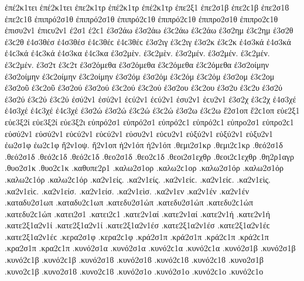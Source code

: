 {ἐπέ2κ1τει ἐπέ2κ1τει
ἐπε2κ1τρ   %
ἐπέ2κ1τρ ἐπέ2κ1τρ
ἐπε2ξ1
ἐπε2σ1β ἐπε2ϲ1β ἐπε2σ1ϐ ἐπε2ϲ1ϐ %
ἐπιπρό2σ1θ ἐπιπρό2σ1θ ἐπιπρό2ϲ1θ ἐπιπρό2ϲ1θ   %
ἐπιπρο2σ1θ ἐπιπρο2ϲ1θ
ἐπισυ2ν1 ἐπιϲυ2ν1   %
ἐ2σ1 ἐ2ϲ1
ἐ3σ2άω ἐ3σ2άω ἐ3ϲ2άω ἐ3ϲ2άω   %
ἐ3σ2ημ ἐ3ϲ2ημ   %
ἐ3σ2θ ἐ3ϲ2θ   %
ἐ4σ3θέσ ἐ4σ3θέσ ἐ4ϲ3θέϲ ἐ4ϲ3θέϲ   %
ἐ3σ2ιγ ἐ3ϲ2ιγ   %
ἐ3σ2κ ἐ3ϲ2κ
ἐ4σ3κά ἐ4σ3κά ἐ4ϲ3κά ἐ4ϲ3κά   %
ἐ4σ3κα ἐ4ϲ3κα   %
%
ἐ3σ2μὲν. ἐ3ϲ2μὲν. ἐ3σ2μέν. ἐ3σ2μέν. ἐ3ϲ2μέν. ἐ3ϲ2μέν.   %
ἐ3σ2τ ἐ3ϲ2τ
ἐ3σ2όμεθα ἐ3σ2όμεθα ἐ3ϲ2όμεθα ἐ3ϲ2όμεθα
ἐ3σ2οίμην ἐ3σ2οίμην ἐ3ϲ2οίμην ἐ3ϲ2οίμην
ἐ3σ2όμ ἐ3σ2όμ ἐ3ϲ2όμ ἐ3ϲ2όμ   %
ἐ3σ2ομ ἐ3ϲ2ομ
ἐ3σ2οῦ ἐ3ϲ2οῦ   %
ἐ3σ2ού ἐ3σ2ού ἐ3ϲ2ού ἐ3ϲ2ού   %
ἐ3σ2ου ἐ3ϲ2ου   %
%
ἐ3σ2υ ἐ3ϲ2υ   %
ἐ3σ2ύ ἐ3σ2ύ ἐ3ϲ2ύ ἐ3ϲ2ύ
ἐσύ2ν1 ἐσύ2ν1 ἐϲύ2ν1 ἐϲύ2ν1   %
ἐσυ2ν1 ἐϲυ2ν1
ἐ3σ2χ ἐ3ϲ2χ
ἐ4σ3χέ ἐ4σ3χέ ἐ4ϲ3χέ ἐ4ϲ3χέ   %
ἐ3σ2ώ ἐ3σ2ώ ἐ3ϲ2ώ ἐ3ϲ2ώ
ἐ3σ2ω ἐ3ϲ2ω
ἔ2σ1οπ ἔ2ϲ1οπ   %
εὐε2ξ1   %
εὐε3ξ2ί εὐε3ξ2ί   %
εὐε3ξ2ι
εὐπρό2σ1 εὐπρό2σ1 εὐπρό2ϲ1 εὐπρό2ϲ1   %
εὐπρο2σ1 εὐπρο2ϲ1
εὐσύ2ν1 εὐσύ2ν1 εὐϲύ2ν1 εὐϲύ2ν1   %
εὐσυ2ν1 εὐϲυ2ν1
εὐξύ2ν1 εὐξύ2ν1   %
εὐξυ2ν1
ἐω2σ1φ ἐω2ϲ1φ   %
ἤ2ν1οψ.   %
ἤ2ν1οπ
ἠ2ν1όπ ἠ2ν1όπ
.θεμι2σ1κρ .θεμι2ϲ1κρ   %
.θεό2σ1δ .θεό2σ1δ .θεό2ϲ1δ .θεό2ϲ1δ   %
.θεο2σ1δ .θεο2ϲ1δ
.θεοι2σ1εχθρ .θεοι2ϲ1εχθρ   %
.θη2ρ1αγρ   %
.θυο2σ1κ .θυο2ϲ1κ   %
.καθυπε2ρ1   %
.καλω2σ1ορ .καλω2ϲ1ορ   %
.καλω2σ1όρ .καλω2σ1όρ .καλω2ϲ1όρ .καλω2ϲ1όρ
.κα2ν1είς. .κα2ν1είς. .κα2ν1είϲ. .κα2ν1είϲ.   %
.κα2ν1εὶς. .κα2ν1εὶϲ.
.κα2ν1είσ. .κα2ν1είσ.
.κα2ν1εὶσ.
.κα2ν1εν
.κα2ν1έν .κα2ν1έν
.καταδυ2σ1ωπ .καταδυ2ϲ1ωπ   %
.κατεδυ2σ1ώπ .κατεδυ2σ1ώπ .κατεδυ2ϲ1ώπ .κατεδυ2ϲ1ώπ   %
.κατει2σ1 .κατει2ϲ1   %
.κατε2ν1αί .κατε2ν1αί   %
.κατε2ν1ή .κατε2ν1ή   %
.κατε2ξ1α2ν1ί .κατε2ξ1α2ν1ί   %
.κατε2ξ1α2ν1έσ .κατε2ξ1α2ν1έσ .κατε2ξ1α2ν1έϲ .κατε2ξ1α2ν1έϲ   %
.κερα2σ1φ .κερα2ϲ1φ   %
.κρά2σ1π .κρά2σ1π .κρά2ϲ1π .κρά2ϲ1π   %
.κρα2σ1π .κρα2ϲ1π
.κυνό2σ1α .κυνό2σ1α .κυνό2ϲ1α .κυνό2ϲ1α   %
.κυνό2σ1β .κυνό2σ1β .κυνό2ϲ1β .κυνό2ϲ1β .κυνό2σ1ϐ .κυνό2σ1ϐ .κυνό2ϲ1ϐ .κυνό2ϲ1ϐ %
.κυνο2σ1β .κυνο2ϲ1β .κυνο2σ1ϐ .κυνο2ϲ1ϐ
.κυνό2σ1ο .κυνό2σ1ο .κυνό2ϲ1ο .κυνό2ϲ1ο   %
}
